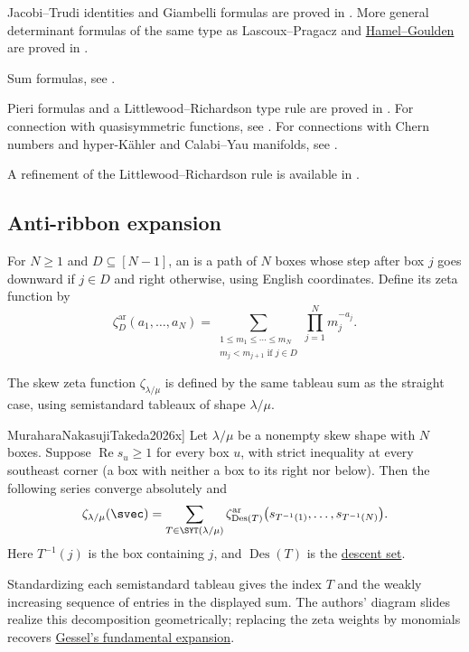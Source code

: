 Jacobi--Trudi identities and Giambelli formulas are proved in \cite{NakasujiPhuksuwanYamasaki2018}.
More general determinant formulas of the same type
as Lascoux--Pragacz and \hyperref[schurStripDecompFormula]{Hamel--Goulden}
are proved in \cite{BachmannCharlton2020}.

Sum formulas, see \cite{BachmannKadotaSuzukiYamamotoYamasaki2023x}.

Pieri formulas and a Littlewood--Richardson type rule are proved in \cite{Nakaoka2023x}.
For connection with quasisymmetric functions, see \cite{Hoffman2008}.
For connections with Chern numbers and hyper-Kähler and Calabi--Yau manifolds, see \cite{Li2021x}.

A refinement of the Littlewood--Richardson rule is available in \cite{Hanaki2026x}.


\subsection[schurZetaAntiRibbon]{Anti-ribbon expansion}

For $N\geq1$ and $D\subseteq[N-1]$, an  is a path of $N$ boxes
whose step after box $j$ goes downward if $j\in D$ and right otherwise,
using English coordinates. Define its zeta function by
\[
 \zeta^{\mathrm{ar}}_D(a_1,\dotsc,a_N)
 =\sum_{\substack{1\leq m_1\leq\dotsb\leq m_N\\
                  m_j<m_{j+1}\text{ if }j\in D}}
     \prod_{j=1}^N m_j^{-a_j}.
\]

The skew zeta function $\zeta_{\lambda/\mu}$ is defined by the same tableau
sum as the straight case, using semistandard tableaux of shape $\lambda/\mu$.

\begin{theorem}[Murahara--Nakasuji--Takeda,
\cite[Thm.~5.5]{MuraharaNakasujiTakeda2026x}]
Let $\lambda/\mu$ be a nonempty skew shape with $N$ boxes. Suppose
$\operatorname{Re}s_u\geq1$ for every box $u$, with strict inequality
at every southeast corner (a box with neither a box to its right nor below).
Then the following series converge absolutely and
\[
 \zeta_{\lambda/\mu}(\svec)
 =\sum_{T\in\SYT(\lambda/\mu)}
   \zeta^{\mathrm{ar}}_{\operatorname{Des}(T)}
       \bigl(s_{T^{-1}(1)},\dotsc,s_{T^{-1}(N)}\bigr).
\]
Here $T^{-1}(j)$ is the box containing $j$, and
$\operatorname{Des}(T)$ is the \hyperref[tableauDescentSet]{descent set}.
\end{theorem}

Standardizing each semistandard tableau gives the index $T$ and the
weakly increasing sequence of entries in the displayed sum.
The authors' diagram slides realize this decomposition geometrically;
replacing the zeta weights by monomials recovers
\hyperref[skewSchurGesselExpansion]{Gessel's fundamental expansion}.

